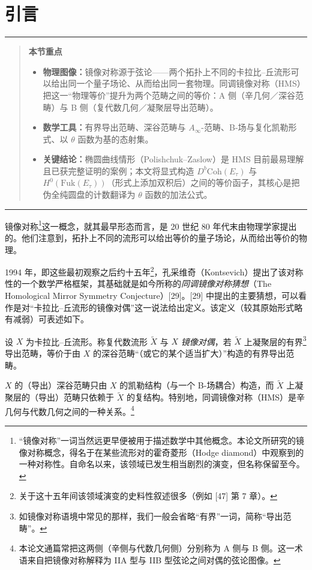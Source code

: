 \documentclass[11pt,a4paper]{article}
\theoremstyle{plain}
\theoremstyle{definition}
\newenvironment{keytakeaways}[1][本节重点]{%
  \par\addvspace{9pt}%
  \noindent\rule{\linewidth}{0.7pt}\par\nobreak
  \begin{quote}\noindent\textbf{#1}\par\small
}{%
  \end{quote}%
  \noindent\rule{\linewidth}{0.7pt}\par\addvspace{7pt}%
}
\begin{document}
\section{引言}

\begin{keytakeaways}
\begin{itemize}
  \item \textbf{物理图像：}镜像对称源于弦论——两个拓扑上不同的卡拉比–丘流形可以给出同一个量子场论、从而给出同一套物理。同调镜像对称（HMS）把这一“物理等价”提升为两个范畴之间的等价：A 侧（辛几何／深谷范畴）与 B 侧（复代数几何／凝聚层导出范畴）。
  \item \textbf{数学工具：}有界导出范畴、深谷范畴与 $A_\infty$-范畴、B-场与复化凯勒形式、以 $\theta$ 函数为基的态射集。
  \item \textbf{关键结论：}椭圆曲线情形（Polishchuk--Zaslow）是 HMS 目前最易理解且已获完整证明的案例；本文将显式构造 $D^b\mathrm{Coh}(E_\tau)$ 与 $H^0(\mathrm{Fuk}(E_\tau))$（形式上添加双积后）之间的等价函子，其核心是把伪全纯圆盘的计数翻译为 $\theta$ 函数的加法公式。
\end{itemize}
\end{keytakeaways}

镜像对称\footnote{“镜像对称”一词当然远更早便被用于描述数学中其他概念。本论文所研究的镜像对称概念，得名于在某些流形对的霍奇菱形（Hodge diamond）中观察到的一种对称性。自命名以来，该领域已发生相当剧烈的演变，但名称保留至今。}这一概念，就其最早形态而言，是 20 世纪 80 年代末由物理学家提出的。他们注意到，拓扑上不同的流形可以给出等价的量子场论，从而给出等价的物理。

1994 年，即这些最初观察之后约十五年\footnote{关于这十五年间该领域演变的史料性叙述很多（例如 [47] 第 7 章）。}，孔采维奇（Kontsevich）提出了该对称性的一个数学严格框架，其基础就是如今所称的\emph{同调镜像对称猜想}（The Homological Mirror Symmetry Conjecture）[29]。[29] 中提出的主要猜想，可以看作是对“卡拉比–丘流形的镜像对偶”这一说法给出定义。该定义（较其原始形式略有减弱）可表述如下。

设 $X$ 为卡拉比–丘流形。称复代数流形 $\tilde X$ 与 $X$ \emph{镜像对偶}，若 $\tilde X$ 上凝聚层的有界\footnote{如镜像对称语境中常见的那样，我们一般会省略“有界”一词，简称“导出范畴”。}导出范畴，等价于由 $X$ 的深谷范畴“（或它的某个适当扩大）”构造的有界导出范畴。

$X$ 的（导出）深谷范畴只由 $X$ 的凯勒结构（与一个 B-场耦合）构造，而 $\tilde X$ 上凝聚层的（导出）范畴只依赖于 $\tilde X$ 的复结构。特别地，同调镜像对称（HMS）是辛几何与代数几何之间的一种关系。\footnote{本论文通篇常把这两侧（辛侧与代数几何侧）分别称为 A 侧与 B 侧。这一术语来自把镜像对称解释为 IIA 型与 IIB 型弦论之间对偶的弦论图像。}
\end{document}
